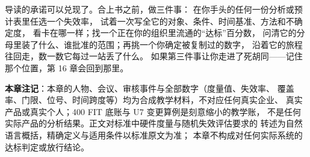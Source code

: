 导读的承诺可以兑现了。合上书之前，做三件事：
在你手头的任何一份分析或预计表里任选一个失效率，
试着一次写全它的对象、条件、时间基准、方法和不确定度，
看卡在哪一样；找一个正在你的组织里流通的“达标”百分数，
问清它的分母里装了什么、谁批准的范围；再挑一个你确定被复制过的数字，
沿着它的旅程往回走，数一数它每过一站丢了什么。
如果第三件事让你走进了死胡同——记住那个位置，第 16 章会回到那里。


\begin{noteblock}
\textbf{本章注记}：本章的人物、会议、审核事件与全部数字（度量值、失效率、
覆盖率、门限、位号、时间跨度等）均为合成教学材料，不对应任何真实企业、
真实产品或真实个人；400 FIT 底账与 U7 变更算例是刻意缩小的教学账，
不是任何实际产品的分析结果。正文对标准中硬件度量与随机失效评估要求的
转述为自然语言概括，精确定义与适用条件以标准原文为准；
本章不构成对任何实际系统的达标判定或放行结论。
\end{noteblock}
